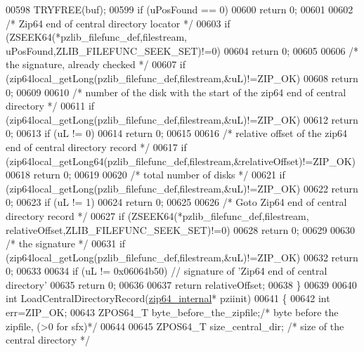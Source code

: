 \begin{DoxyCode}
00598   TRYFREE(buf);
00599   \textcolor{keywordflow}{if} (uPosFound == 0)
00600     \textcolor{keywordflow}{return} 0;
00601 
00602   \textcolor{comment}{/* Zip64 end of central directory locator */}
00603   \textcolor{keywordflow}{if} (ZSEEK64(*pzlib\_filefunc\_def,filestream, uPosFound,ZLIB\_FILEFUNC\_SEEK\_SET)!=0)
00604     \textcolor{keywordflow}{return} 0;
00605 
00606   \textcolor{comment}{/* the signature, already checked */}
00607   \textcolor{keywordflow}{if} (zip64local\_getLong(pzlib\_filefunc\_def,filestream,&uL)!=ZIP\_OK)
00608     \textcolor{keywordflow}{return} 0;
00609 
00610   \textcolor{comment}{/* number of the disk with the start of the zip64 end of  central directory */}
00611   \textcolor{keywordflow}{if} (zip64local\_getLong(pzlib\_filefunc\_def,filestream,&uL)!=ZIP\_OK)
00612     \textcolor{keywordflow}{return} 0;
00613   \textcolor{keywordflow}{if} (uL != 0)
00614     \textcolor{keywordflow}{return} 0;
00615 
00616   \textcolor{comment}{/* relative offset of the zip64 end of central directory record */}
00617   \textcolor{keywordflow}{if} (zip64local\_getLong64(pzlib\_filefunc\_def,filestream,&relativeOffset)!=ZIP\_OK)
00618     \textcolor{keywordflow}{return} 0;
00619 
00620   \textcolor{comment}{/* total number of disks */}
00621   \textcolor{keywordflow}{if} (zip64local\_getLong(pzlib\_filefunc\_def,filestream,&uL)!=ZIP\_OK)
00622     \textcolor{keywordflow}{return} 0;
00623   \textcolor{keywordflow}{if} (uL != 1)
00624     \textcolor{keywordflow}{return} 0;
00625 
00626   \textcolor{comment}{/* Goto Zip64 end of central directory record */}
00627   \textcolor{keywordflow}{if} (ZSEEK64(*pzlib\_filefunc\_def,filestream, relativeOffset,ZLIB\_FILEFUNC\_SEEK\_SET)!=0)
00628     \textcolor{keywordflow}{return} 0;
00629 
00630   \textcolor{comment}{/* the signature */}
00631   \textcolor{keywordflow}{if} (zip64local\_getLong(pzlib\_filefunc\_def,filestream,&uL)!=ZIP\_OK)
00632     \textcolor{keywordflow}{return} 0;
00633 
00634   \textcolor{keywordflow}{if} (uL != 0x06064b50) \textcolor{comment}{// signature of 'Zip64 end of central directory'}
00635     \textcolor{keywordflow}{return} 0;
00636 
00637   \textcolor{keywordflow}{return} relativeOffset;
00638 \}
00639 
00640 \textcolor{keywordtype}{int} LoadCentralDirectoryRecord(\hyperlink{structzip64__internal}{zip64\_internal}* pziinit)
00641 \{
00642   \textcolor{keywordtype}{int} err=ZIP\_OK;
00643   ZPOS64\_T byte\_before\_the\_zipfile;\textcolor{comment}{/* byte before the zipfile, (>0 for sfx)*/}
00644 
00645   ZPOS64\_T size\_central\_dir;     \textcolor{comment}{/* size of the central directory  */}

\end{DoxyCode}
